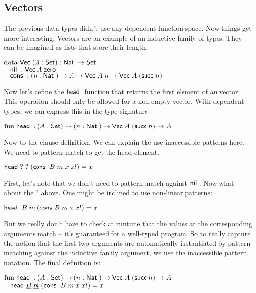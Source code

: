 \subsection{Vectors}
The previous data types didn't use any dependent function space. 
Now things get more interesting. Vectors are an example of an inductive family of types.
They can be imagined as lists that store their length.
\begin{bsp}
$\mathrm{data}\; \mathsf{Vec}\; ( A : \mathsf{Set} ) : \mathsf{Nat}\; \rightarrow \mathsf{Set} $ \\
$\hspace*{3mm} \mathsf{nil}\; : \mathsf{Vec}\; A \; \mathsf{zero}\;  $\\
$ \hspace*{3mm} \mathsf{cons}\; : ( n : \mathsf{Nat}\; ) \rightarrow{ A \rightarrow\mathsf{Vec}\;A \; n \rightarrow\mathsf{Vec}\;A \; (\mathsf{succ}\;n)} $
\end{bsp}
Now let's define the $\mathsf{head}\;$ function that returns the first element of an vector. This operation should only be allowed for a non-empty vector.
With dependent types, we can express this in the type signature
\begin{bsp}
$ \mathrm{fun}\; \mathsf{head}\; : ( A : \mathsf{Set} ) \rightarrow ( n : \mathsf{Nat}\; ) \rightarrow \mathsf{Vec}\; A \; (\mathsf{succ}\; n) \rightarrow A $
\end{bsp}
Now to the clause definition. We can explain the use inaccessible patterns here.
We need to pattern match to get the head element.
\begin{bsp}
$\mathsf{head}\; ? \; ? \; (\mathsf{cons}\; \; B \; m \; x \; xl) = x $
\end{bsp}
First, let's note that we don't need to pattern match against $\mathsf{nil}\;$.
Now what about the ? above. 
One might be inclined to use non-linear patterns:
\begin{bsp}
$\mathsf{head}\; \; B \; m \; (\mathsf{cons}\;  B \; m \; x \; xl) = x $
\end{bsp}
But we really don't have to check at runtime that the values at the corresponding arguments match -- it's guaranteed for a well-typed program.
So to really capture the notion that the first two arguments are automatically instantiated by pattern matching against the inductive family argument, we use the inaccessible pattern notation. The final definition is:
\begin{bsp}
$ \mathrm{fun}\; \mathsf{head}\; : ( A : \mathsf{Set} ) \rightarrow ( n : \mathsf{Nat}\; ) \rightarrow \mathsf{Vec}\; A \; (\mathsf{succ}\; n) \rightarrow A $\\
$ \hspace*{3mm} \mathsf{head}\; \underline{B} \; \underline{m} \; (\mathsf{cons}\; \; B \; m \; x \; xl) = x $
\end{bsp}

